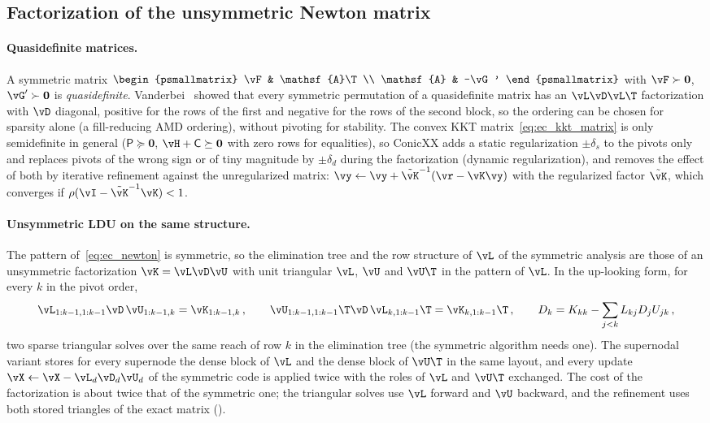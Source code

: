 \subsection{Factorization of the unsymmetric Newton matrix}\label{sec:ec_ldu}
%
\paragraph{Quasidefinite matrices.} A symmetric matrix $\begin{psmallmatrix} \vF & \mathsf{A}\T \\ \mathsf{A} & -\vG' \end{psmallmatrix}$ with $\vF \succ \mathbf{0}$, $\vG' \succ \mathbf{0}$ is \emph{quasidefinite}. Vanderbei~\cite{Vanderbei1995} showed that every symmetric permutation of a quasidefinite matrix has an $\vL\vD\vL\T$ factorization with $\vD$ diagonal, positive for the rows of the first and negative for the rows of the second block, so the ordering can be chosen for sparsity alone (a fill-reducing AMD ordering), without pivoting for stability. The convex KKT matrix~\eqref{eq:ec_kkt_matrix} is only semidefinite in general ($\mathsf{P} \succeq \mathbf{0}$, $\vH + \mathsf{C} \succeq \mathbf{0}$ with zero rows for equalities), so ConicXX adds a static regularization $\pm\delta_s$ to the pivots only and replaces pivots of the wrong sign or of tiny magnitude by $\pm\delta_d$ during the factorization (dynamic regularization), and removes the effect of both by iterative refinement against the unregularized matrix: $\vy \leftarrow \vy + \tilde{\vK}^{-1}(\vr - \vK\vy)$ with the regularized factor $\tilde{\vK}$, which converges if $\rho(\vI - \tilde{\vK}^{-1}\vK) < 1$.
%
\paragraph{Unsymmetric LDU on the same structure.} The pattern of~\eqref{eq:ec_newton} is symmetric, so the elimination tree and the row structure of $\vL$ of the symmetric analysis are those of an unsymmetric factorization $\vK = \vL\vD\vU$ with unit triangular $\vL$, $\vU$ and $\vU\T$ in the pattern of $\vL$. In the up-looking form, for every $k$ in the pivot order,
%
\begin{equation}\label{eq:ec_updown}
	\vL_{1:k-1,1:k-1}\vD\,\vU_{1:k-1,k} = \vK_{1:k-1,k} \, , \qquad
	\vU_{1:k-1,1:k-1}\T\vD\,\vL_{k,1:k-1}\T = \vK_{k,1:k-1}\T \, , \qquad
	D_k = K_{kk} - \sum_{j<k} L_{kj}D_jU_{jk} \, ,
\end{equation}
%
two sparse triangular solves over the same reach of row $k$ in the elimination tree (the symmetric algorithm needs one). The supernodal variant stores for every supernode the dense block of $\vL$ and the dense block of $\vU\T$ in the same layout, and every update $\vX \leftarrow \vX - \vL_d\vD_d\vU_d$ of the symmetric code is applied twice with the roles of $\vL$ and $\vU\T$ exchanged. The cost of the factorization is about twice that of the symmetric one; the triangular solves use $\vL$ forward and $\vU$ backward, and the refinement uses both stored triangles of the exact matrix ().
%
